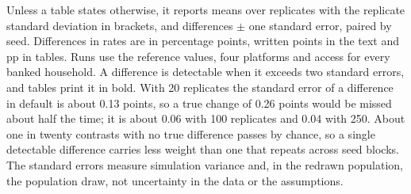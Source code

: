 Unless a table states otherwise, it reports means over replicates with the replicate standard
deviation in brackets, and differences $\pm$ one standard error, paired by seed. Differences in
rates are in percentage points, written points in the text and pp in tables. Runs use the
reference values, four platforms and access for every banked household. A difference is
detectable when it exceeds two standard errors, and tables print it in bold. With 20 replicates
the standard error of a difference in default is about 0.13 points, so a true change of 0.26
points would be missed about half the time; it is about 0.06 with 100 replicates and 0.04 with
250. About one in twenty contrasts with no true difference passes by chance, so a single
detectable difference carries less weight than one that repeats across seed blocks. The standard errors measure simulation variance and, in the redrawn population, the population
draw, not uncertainty in the data or the assumptions.

